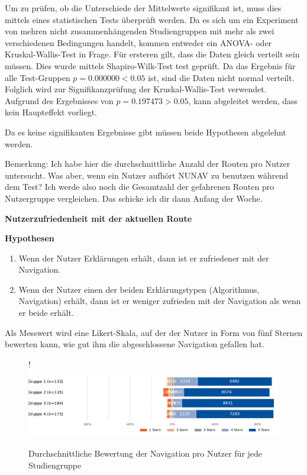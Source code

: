 Um zu prüfen, ob die Unterschiede der Mittelwerte signifikant ist, muss dies mittels eines statistischen Tests überprüft werden. Da es sich um ein Experiment von mehren nicht zusammenhängenden Studiengruppen mit mehr als zwei verschiedenen Bedingungen handelt, kommen entweder ein ANOVA- oder Kruskal-Wallis-Test in Frage. Für ersteren gilt, dass die Daten gleich verteilt sein müssen. Dies wurde mittels Shapiro-Wilk-Test test geprüft. Da das Ergebnis für alle Test-Gruppen $ p = 0.000000 < 0.05 $ ist, sind die Daten nicht normal verteilt. Folglich wird zur Signifikanzprüfung der Kruskal-Wallis-Test verwendet. Aufgrund des Ergebnisses von $ p = 0.197473 > 0.05 $, kann abgeleitet werden, dass kein Haupteffekt vorliegt.

Da es keine signifikanten Ergebnisse gibt müssen beide Hypothesen abgelehnt werden.

Bemerkung: Ich habe hier die durchschnittliche Anzahl der Routen pro Nutzer untersucht. Was aber, wenn ein Nutzer aufhört NUNAV zu benutzen während dem Test? Ich werde also noch die Gesamtzahl der gefahrenen Routen pro Nutzergruppe vergleichen. Das schicke ich dir dann Anfang der Woche.

\textbf{Nutzerzufriedenheit mit der aktuellen Route}

\textbf{Hypothesen}

\begin{enumerate}
    \item Wenn der Nutzer Erklärungen erhält, dann ist er zufriedener mit der Navigation.
    \item Wenn der Nutzer einen der beiden Erklärungstypen (Algorithmus, Navigation) erhält, dann ist er weniger zufrieden mit der Navigation als wenn er beide erhält.
\end{enumerate}

Als Messwert wird eine Likert-Skala, auf der der Nutzer in Form von fünf Sternen bewerten kann, wie gut ihm die abgeschlossene Navigation gefallen hat. 

\begin{figure}[bth]!
    \includegraphics[width=\linewidth]{contents/06_model_evaluation/res/Rating_Result_Overview.pdf}
    \caption{Durchschnittliche Bewertung der Navigation pro Nutzer  für jede Studiengruppe}
\end{figure}

